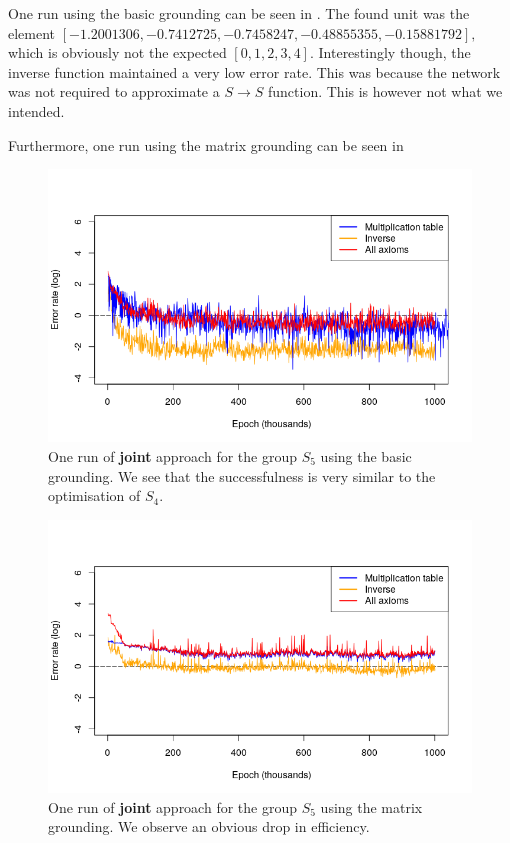 One run using the basic grounding can be seen in . The found unit was the element $[-1.2001306,  -0.7412725,  -0.7458247,  -0.48855355, -0.15881792],$ which is obviously not the expected $[0,1,2,3,4]$. Interestingly though, the inverse function maintained a very low error rate. This was because the network was not required to approximate a $S\rightarrow S$ function. This is however not what we intended.

Furthermore, one run using the matrix grounding can be seen in 


\begin{figure}
\caption{One run of \textbf{joint} approach for the group $S_5$ using the basic grounding. We see that the successfulness is very similar to the optimisation of $S_4$.}
\label{graph:s5_joint_basic}
\includegraphics[width=\linewidth]{../img/s5_joint_basic.png}
\end{figure}
\begin{figure}
\caption{One run of \textbf{joint} approach for the group $S_5$ using the matrix grounding. We observe an obvious drop in efficiency.}
\label{graph:s5_joint_basic}
\includegraphics[width=\linewidth]{../img/s5_joint_matrix.png}
\end{figure}